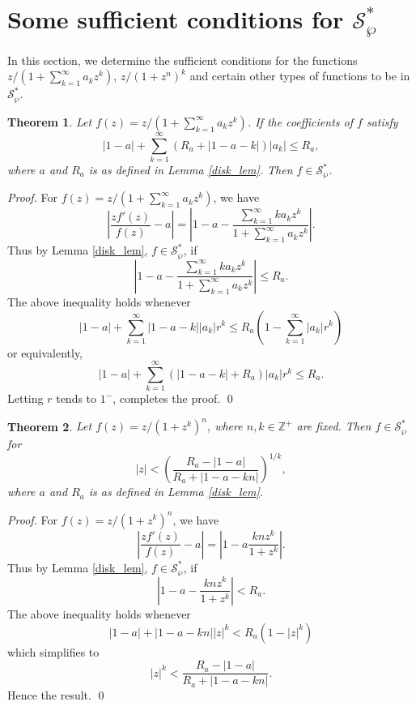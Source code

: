 \documentclass[12pt, reqno]{amsart}
\numberwithin{equation}{section}
\theoremstyle{plain}
\newtheorem{theorem}{Theorem}[section]
\theoremstyle{definition}
\theoremstyle{remark}
\begin{document}

\section{Some sufficient conditions for $\mathcal{S}^*_{\wp}$}
In this section, we determine the sufficient conditions for the functions $z/(1+\sum_{k=1}^{\infty}a_kz^k)$, $z/(1+z^n)^k$ and certain other types of functions to be in $\mathcal{S}^*_{\wp}$. 
\begin{theorem}
	Let $f(z)={z}/({1+\sum_{k=1}^{\infty}a_kz^k})$. If the coefficients of $f$ satisfy
	$$|1-a|+\sum_{k=1}^{\infty}(R_a+|1-a-k|)|a_k|\leq R_a,$$
	where $a$ and $R_a$ is as defined in Lemma \ref{disk_lem}. Then $f\in \mathcal{S}^*_{\wp}$.
\end{theorem}
\begin{proof}
	For $f(z)={z}/({1+\sum_{k=1}^{\infty}a_kz^k})$, we have
	$$\left|\frac{zf'(z)}{f(z)}-a\right|=\left|1-a-\frac{\sum_{k=1}^{\infty}ka_kz^k}{1+\sum_{k=1}^{\infty}a_kz^k}\right|.$$
	Thus by Lemma \ref{disk_lem}, $f\in \mathcal{S}^*_{\wp}$, if
	$$\left|1-a-\frac{\sum_{k=1}^{\infty}ka_kz^k}{1+\sum_{k=1}^{\infty}a_kz^k}\right|\leq R_a.$$
	The above inequality holds whenever
	$$|1-a|+\sum_{k=1}^{\infty}|1-a-k||a_k|r^k\leq R_a(1-\sum_{k=1}^{\infty}|a_k|r^k)$$
	or equivalently,
	$$|1-a|+\sum_{k=1}^{\infty}(|1-a-k|+R_a)|a_k|r^k\leq R_a.$$
	Letting $r$ tends to $1^{-}$, completes the proof. \qed
\end{proof}

\begin{theorem}
	Let $f(z)=z/(1+z^k)^n$, where $n,k\in \mathbb{Z}^{+}$ are fixed. Then $f\in \mathcal{S}^*_{\wp}$ for
	$$|z|<\left(\frac{R_a-|1-a|}{R_a+|1-a-kn|}\right)^{1/k},$$
	where $a$ and $R_a$ is as defined in Lemma \ref{disk_lem}.
\end{theorem}
\begin{proof}
	For $f(z)=z/(1+z^k)^n$, we have
	$$\left|\frac{zf'(z)}{f(z)}-a\right|=\left|1-a\frac{knz^k}{1+z^k}\right|.$$
	Thus by Lemma \ref{disk_lem}, $f\in \mathcal{S}^*_{\wp}$, if
	$$\left|1-a-\frac{knz^k}{1+z^k}\right|<R_a.$$ 
	The above inequality holds whenever
	$$|1-a|+|1-a-kn||z|^k<R_a(1-|z|^k)$$
	which simplifies to
	$$|z|^k<\frac{R_a-|1-a|}{R_a+|1-a-kn|}.$$
	Hence the result. \qed
\end{proof}
\end{document}
